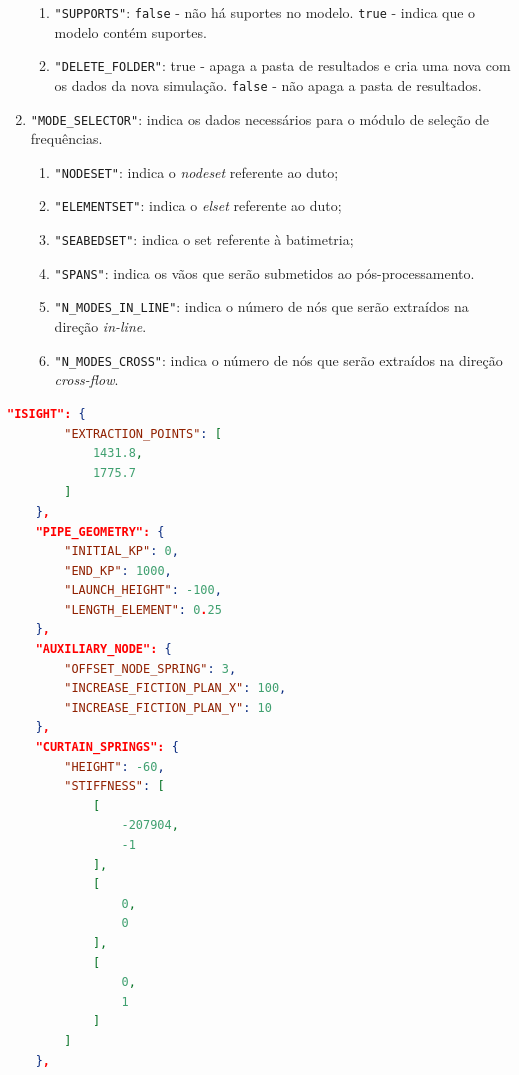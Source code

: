 \begin{enumerate}
\begin{enumerate}
        \item \texttt{"SUPPORTS"}: \texttt{false} - não há suportes no modelo. \texttt{true} - indica que o modelo contém suportes.
        \item \texttt{"DELETE\_FOLDER"}: true - apaga a pasta de resultados e cria uma nova com os dados da nova simulação. \texttt{false} - não apaga a pasta de resultados.
    \end{enumerate}
    \item \texttt{"MODE\_SELECTOR"}: indica os dados necessários para o módulo de seleção de frequências.
    \begin{enumerate}
        \item \texttt{"NODESET"}: indica o \textit{nodeset} referente ao duto;
        \item \texttt{"ELEMENTSET"}: indica o \textit{elset} referente ao duto;
        \item \texttt{"SEABEDSET"}: indica o set referente à batimetria;
        \item \texttt{"SPANS"}: indica os vãos que serão submetidos ao pós-processamento.
        \item \texttt{"N\_MODES\_IN\_LINE"}: indica o número de nós que serão extraídos na direção \textit{in-line}.
        \item \texttt{"N\_MODES\_CROSS"}: indica o número de nós que serão extraídos na direção \textit{cross-flow}.
    \end{enumerate}
\end{enumerate}

\begin{lstlisting}[firstnumber=36, language=json, label={tab:jdsn-arquivojson2}, caption={Exemplo de arquivo de entrada de dados - Parte 2/7}]
    "ISIGHT": {
        "EXTRACTION_POINTS": [
            1431.8,
            1775.7
        ]
    },
    "PIPE_GEOMETRY": {
        "INITIAL_KP": 0,
        "END_KP": 1000,
        "LAUNCH_HEIGHT": -100,
        "LENGTH_ELEMENT": 0.25
    },
    "AUXILIARY_NODE": {
        "OFFSET_NODE_SPRING": 3,
        "INCREASE_FICTION_PLAN_X": 100,
        "INCREASE_FICTION_PLAN_Y": 10
    },
    "CURTAIN_SPRINGS": {
        "HEIGHT": -60,
        "STIFFNESS": [
            [
                -207904,
                -1
            ],
            [
                0,
                0
            ],
            [
                0,
                1
            ]
        ]
    },
\end{lstlisting}

